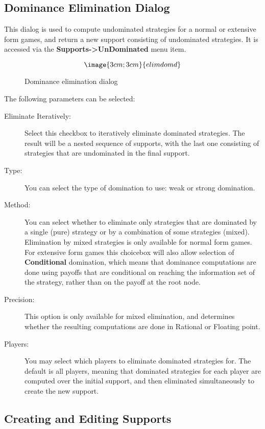 \subsection{Dominance Elimination Dialog}\label{UnDominated}

This dialog is used to compute undominated strategies for a normal or
extensive form games, and return a new support consisting of
undominated strategies.  It is accessed via the {\bf 
Supports->UnDominated} menu item.

\begin{figure}
$$\image{3cm;3cm}{elimdomd}$$
\caption{Dominance elimination dialog}\label{fig_elimdomd}
\end{figure}

The following parameters can be selected:

\begin{description}
\item[Eliminate Iteratively:] Select this checkbox to iteratively
eliminate dominated strategies. The result will be a nested sequence
of supports, with the last one consisting of strategies that are
undominated in the final support.
\item[Type:] You can select the type of domination to use: weak or
strong domination.  
\item[Method:] You can select whether to eliminate only strategies
that are dominated by a single (pure) strategy or by a combination of
some strategies (mixed).  Elimination by mixed strategies is only
available for normal form games.  For extensive form games this
choicebox will also allow selection of {\bf Conditional} domination,
which means that dominance computations are done using payoffs that
are conditional on reaching the information set of the strategy,
rather than on the payoff at the root node.
\item[Precision:] This option is only available for mixed elimination,
and determines whether the resulting computations are done in Rational
or Floating point.  
\item[Players:] You may select which players to eliminate dominated
strategies for. The default is all players, meaning that dominated
strategies for each player are computed over the initial support, and
then eliminated simultaneously to create the new support.
\end{description}

\subsection{Creating and Editing Supports}\label{EditSupport}

